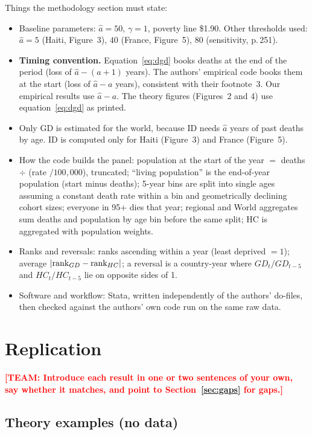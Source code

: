 \documentclass[12pt,a4paper]{article}
\newcommand{\todo}[1]{\textbf{\textcolor{red}{[TEAM: #1]}}}
\newcommand{\ahat}{\hat{a}}
\begin{document}
Things the methodology section must state:
\begin{itemize}
  \item Baseline parameters: $\ahat=50$, $\gamma=1$, poverty line \$1.90. Other thresholds used: $\ahat=5$ (Haiti, Figure~3), $40$ (France, Figure~5), $80$ (sensitivity, p.\,251).
  \item \textbf{Timing convention.} Equation~\eqref{eq:dgd} books deaths at the end of the period (loss of $\ahat-(a+1)$ years). The authors' empirical code books them at the start (loss of $\ahat-a$ years), consistent with their footnote~3. Our empirical results use $\ahat-a$. The theory figures (Figures~2 and 4) use equation~\eqref{eq:dgd} as printed.
  \item Only GD is estimated for the world, because ID needs $\ahat$ years of past deaths by age. ID is computed only for Haiti (Figure~3) and France (Figure~5).
  \item How the code builds the panel: population at the start of the year $=$ deaths $\div$ (rate $/100{,}000$), truncated; ``living population'' is the end-of-year population (start minus deaths); 5-year bins are split into single ages assuming a constant death rate within a bin and geometrically declining cohort sizes; everyone in 95+ dies that year; regional and World aggregates sum deaths and population by age bin before the same split; HC is aggregated with population weights.
  \item Ranks and reversals: ranks ascending within a year (least deprived $=1$); average $|{\rm rank}_{GD}-{\rm rank}_{HC}|$; a reversal is a country-year where $GD_t/GD_{t-5}$ and $HC_t/HC_{t-5}$ lie on opposite sides of 1.
  \item Software and workflow: Stata, written independently of the authors' do-files, then checked against the authors' own code run on the same raw data.
\end{itemize}

\section{Replication}
\todo{Introduce each result in one or two sentences of your own, say whether it matches, and point to Section~\ref{sec:gaps} for gaps.}

\subsection{Theory examples (no data)}
\end{document}
